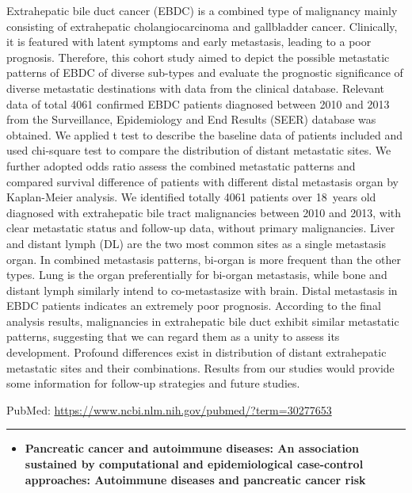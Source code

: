\documentclass[]{article}
\providecommand{\tightlist}{%
  \setlength{\itemsep}{0pt}\setlength{\parskip}{0pt}}
\begin{document}
Extrahepatic bile duct cancer (EBDC) is a combined type of malignancy
mainly consisting of extrahepatic cholangiocarcinoma and gallbladder
cancer. Clinically, it is featured with latent symptoms and early
metastasis, leading to a poor prognosis. Therefore, this cohort study
aimed to depict the possible metastatic patterns of EBDC of diverse
sub-types and evaluate the prognostic significance of diverse metastatic
destinations with data from the clinical database. Relevant data of
total 4061 confirmed EBDC patients diagnosed between 2010 and 2013 from
the Surveillance, Epidemiology and End Results (SEER) database was
obtained. We applied t test to describe the baseline data of patients
included and used chi-square test to compare the distribution of distant
metastatic sites. We further adopted odds ratio assess the combined
metastatic patterns and compared survival difference of patients with
different distal metastasis organ by Kaplan-Meier analysis. We
identified totally 4061 patients over 18~years old diagnosed with
extrahepatic bile tract malignancies between 2010 and 2013, with clear
metastatic status and follow-up data, without primary malignancies.
Liver and distant lymph (DL) are the two most common sites as a single
metastasis organ. In combined metastasis patterns, bi-organ is more
frequent than the other types. Lung is the organ preferentially for
bi-organ metastasis, while bone and distant lymph similarly intend to
co-metastasize with brain. Distal metastasis in EBDC patients indicates
an extremely poor prognosis. According to the final analysis results,
malignancies in extrahepatic bile duct exhibit similar metastatic
patterns, suggesting that we can regard them as a unity to assess its
development. Profound differences exist in distribution of distant
extrahepatic metastatic sites and their combinations. Results from our
studies would provide some information for follow-up strategies and
future studies.

PubMed: \url{https://www.ncbi.nlm.nih.gov/pubmed/?term=30277653}

{}

{}

\begin{center}\rule{0.5\linewidth}{\linethickness}\end{center}

\begin{itemize}
\tightlist
\item
  \textbf{Pancreatic cancer and autoimmune diseases: An association
  sustained by computational and epidemiological case-control
  approaches: Autoimmune diseases and pancreatic cancer risk}
\end{itemize}
\end{document}
